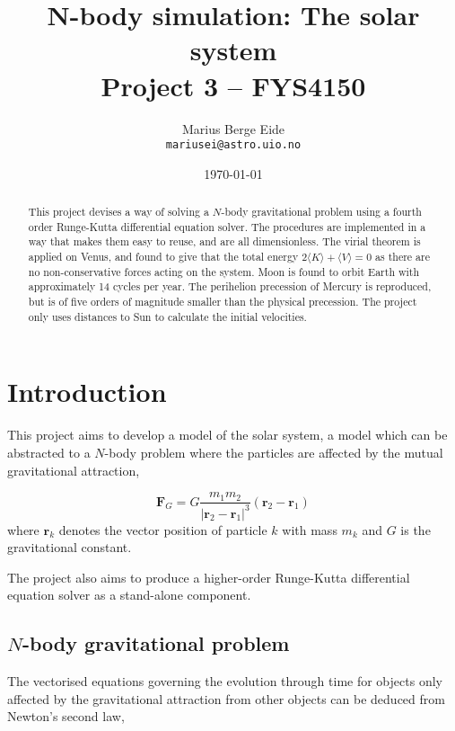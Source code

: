 \documentclass[a4paper,11pt]{article}
\date{\today}
\title{N-body simulation: The solar system\\ \small{Project 3 -- FYS4150}}
\author{Marius Berge Eide \\
\texttt{mariusei@astro.uio.no}}
\begin{document}
\onecolumn
\maketitle{}

\begin{abstract}
    This project devises a way of solving a $N$-body gravitational problem using a fourth order Runge-Kutta differential equation solver. The procedures are implemented in a way that makes them easy to reuse, and are all dimensionless. The virial theorem is applied on Venus, and found to give that the total energy $2\langle K \rangle + \langle V \rangle = 0$ as there are no non-conservative forces acting on the system. Moon is found to orbit Earth with approximately 14 cycles per year. The perihelion precession of Mercury is reproduced, but is of five orders of magnitude smaller than the physical precession. The project only uses distances to Sun to calculate the initial velocities.
\end{abstract}

\section{Introduction}
This project aims to develop a model of the solar system, a model which can be abstracted to a $N$-body problem where the particles are affected by the mutual gravitational attraction,

\begin{equation}
    \mathbf{F}_G = G \frac{m_1 m_2}{|\mathbf{r}_2 - \mathbf{r}_1|^3} \left( \mathbf{r}_2 - \mathbf{r}_1  \right)
    \label{eq:gravity}
\end{equation}
where $\mathbf{r}_k$ denotes the vector position of particle $k$ with mass $m_k$ and $G$ is the gravitational constant. 

The project also aims to produce a higher-order Runge-Kutta differential equation solver as a stand-alone component. 

\subsection{$N$-body gravitational problem}
The vectorised equations governing the evolution through time for objects only affected by the gravitational attraction from other objects can be deduced from Newton's second law,
\end{document}
